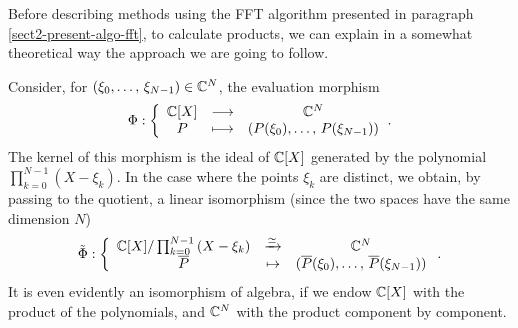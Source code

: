  
Before describing methods using the FFT algorithm presented in paragraph \ref{sect2-present-algo-fft}, to calculate products, we can explain in a somewhat theoretical way the approach we are going to follow.
 
 
   Consider, for $ (\xi_0, \ldots, \, \xi_{N-1}) \in \mathbb{C}^N $, the evaluation morphism
\begin{equation*}
\Phi: {\left\{ \begin{array}{ccc} \mathbb{C} [X] & \longrightarrow & \mathbb{C}^N \\ P & \longmapsto & \left(P (\xi_0), \ldots, \, P (\xi_{N-1}) \right) \end{array} \right.} .
\end{equation*}
The kernel of this morphism is the ideal of $ \mathbb{C} [X] $ generated by the polynomial $ \prod_{k = 0}^{N-1}{(X- \xi_k)} $. In the case where the points $ \xi_k $ are distinct, we obtain, by passing to the quotient, a linear isomorphism (since the two spaces have the same dimension $ N $)
\begin{equation*}
\tilde{\Phi}: \left\{\begin{array}{ccc} \mathbb{C} [X] / \prod_{k = 0}^{N-1}{(X- \xi_k)} & \xrightarrow{\simeq} & \mathbb{C}^N \\\overline{P} & \mapsto & (\overline{P} (\xi_0), \ldots, \, \overline{P} (\xi_{N-1})) \end{array} \right. .
\end{equation*}
It is even evidently an isomorphism of algebra, if we endow $ \mathbb{C} [X] $ with the product of the polynomials, and $ \mathbb{C}^N $ with the product component by component.
 
